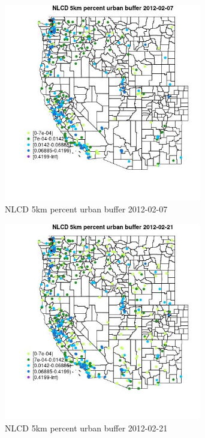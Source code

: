 \begin{figure} 
\centering  
\includegraphics[width=0.77\textwidth]{Code_Outputs/Report_ML_input_PM25_Step4_part_f_de_duplicated_aveswNAs_MapObsNLCD_5km_percent_urban_buffer2012-02-07.jpg} 
\caption{\label{fig:Report_ML_input_PM25_Step4_part_f_de_duplicated_aveswNAsMapObsNLCD_5km_percent_urban_buffer2012-02-07}NLCD 5km percent urban buffer 2012-02-07} 
\end{figure} 
 

\begin{figure} 
\centering  
\includegraphics[width=0.77\textwidth]{Code_Outputs/Report_ML_input_PM25_Step4_part_f_de_duplicated_aveswNAs_MapObsNLCD_5km_percent_urban_buffer2012-02-21.jpg} 
\caption{\label{fig:Report_ML_input_PM25_Step4_part_f_de_duplicated_aveswNAsMapObsNLCD_5km_percent_urban_buffer2012-02-21}NLCD 5km percent urban buffer 2012-02-21} 
\end{figure} 
 

